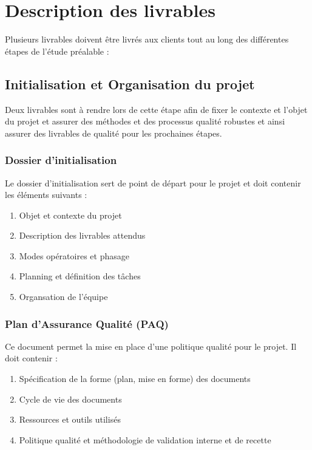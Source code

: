 \chapter{Description des livrables}

Plusieurs livrables doivent être livrés aux clients tout au long des différentes étapes de l'étude préalable :

	\section{Initialisation et Organisation du projet}

		Deux livrables sont à rendre lors de cette étape afin de fixer le contexte et l'objet du projet et assurer des méthodes et des processus qualité robustes et ainsi assurer des livrables de qualité pour les prochaines étapes.

		\subsection{Dossier d'initialisation}

		Le dossier d'initialisation sert de point de départ pour le projet et doit contenir les éléments suivants :

		\begin{enumerate}
			\item Objet et contexte du projet
			\item Description des livrables attendus
			\item Modes opératoires et phasage
			\item Planning et définition des tâches
			\item Organsation de l'équipe
		\end{enumerate}

		\subsection{Plan d'Assurance Qualité (PAQ)}

		Ce document permet la mise en place d'une politique qualité pour le projet. Il doit contenir :

		\begin{enumerate}
			\item Spécification de la forme (plan, mise en forme) des documents
			\item Cycle de vie des documents
			\item Ressources et outils utilisés
			\item Politique qualité et méthodologie de validation interne et de recette
		\end{enumerate}


